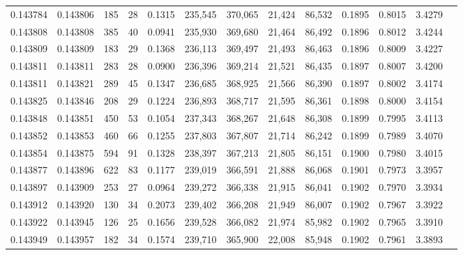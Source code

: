\begin{tabular}{rrrrrrrrrrrrr}
0.143784 & 0.143806 &   185 &  28 &                                     0.1315 & 235,545 & 370,065 &  21,424 &  86,532 & 0.1895 & 0.8015 & 3.4279 \\
0.143808 & 0.143808 &   385 &  40 &                                     0.0941 & 235,930 & 369,680 &  21,464 &  86,492 & 0.1896 & 0.8012 & 3.4244 \\
0.143809 & 0.143809 &   183 &  29 &                                     0.1368 & 236,113 & 369,497 &  21,493 &  86,463 & 0.1896 & 0.8009 & 3.4227 \\
0.143811 & 0.143811 &   283 &  28 &                                     0.0900 & 236,396 & 369,214 &  21,521 &  86,435 & 0.1897 & 0.8007 & 3.4200 \\
0.143811 & 0.143821 &   289 &  45 &                                     0.1347 & 236,685 & 368,925 &  21,566 &  86,390 & 0.1897 & 0.8002 & 3.4174 \\
0.143825 & 0.143846 &   208 &  29 &                                     0.1224 & 236,893 & 368,717 &  21,595 &  86,361 & 0.1898 & 0.8000 & 3.4154 \\
0.143848 & 0.143851 &   450 &  53 &                                     0.1054 & 237,343 & 368,267 &  21,648 &  86,308 & 0.1899 & 0.7995 & 3.4113 \\
0.143852 & 0.143853 &   460 &  66 &                                     0.1255 & 237,803 & 367,807 &  21,714 &  86,242 & 0.1899 & 0.7989 & 3.4070 \\
0.143854 & 0.143875 &   594 &  91 &                                     0.1328 & 238,397 & 367,213 &  21,805 &  86,151 & 0.1900 & 0.7980 & 3.4015 \\
0.143877 & 0.143896 &   622 &  83 &                                     0.1177 & 239,019 & 366,591 &  21,888 &  86,068 & 0.1901 & 0.7973 & 3.3957 \\
0.143897 & 0.143909 &   253 &  27 &                                     0.0964 & 239,272 & 366,338 &  21,915 &  86,041 & 0.1902 & 0.7970 & 3.3934 \\
0.143912 & 0.143920 &   130 &  34 &                                     0.2073 & 239,402 & 366,208 &  21,949 &  86,007 & 0.1902 & 0.7967 & 3.3922 \\
0.143922 & 0.143945 &   126 &  25 &                                     0.1656 & 239,528 & 366,082 &  21,974 &  85,982 & 0.1902 & 0.7965 & 3.3910 \\
0.143949 & 0.143957 &   182 &  34 &                                     0.1574 & 239,710 & 365,900 &  22,008 &  85,948 & 0.1902 & 0.7961 & 3.3893 \\

\end{tabular}
